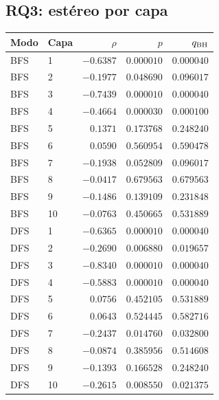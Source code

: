 \documentclass[11pt,a4paper]{article}
\begin{document}
\subsection{RQ3: estéreo por capa}
{\small\setlength{\tabcolsep}{5pt}
\begin{longtable}{llrrr}
\toprule
Modo & Capa & $\rho$ & $p$ & $q_{\rm BH}$ \\
\midrule\endhead
BFS & 1 & $-0.6387$ & $0.000010$ & $0.000040$ \\
BFS & 2 & $-0.1977$ & $0.048690$ & $0.096017$ \\
BFS & 3 & $-0.7439$ & $0.000010$ & $0.000040$ \\
BFS & 4 & $-0.4664$ & $0.000030$ & $0.000100$ \\
BFS & 5 & $0.1371$ & $0.173768$ & $0.248240$ \\
BFS & 6 & $0.0590$ & $0.560954$ & $0.590478$ \\
BFS & 7 & $-0.1938$ & $0.052809$ & $0.096017$ \\
BFS & 8 & $-0.0417$ & $0.679563$ & $0.679563$ \\
BFS & 9 & $-0.1486$ & $0.139109$ & $0.231848$ \\
BFS & 10 & $-0.0763$ & $0.450665$ & $0.531889$ \\
DFS & 1 & $-0.6365$ & $0.000010$ & $0.000040$ \\
DFS & 2 & $-0.2690$ & $0.006880$ & $0.019657$ \\
DFS & 3 & $-0.8340$ & $0.000010$ & $0.000040$ \\
DFS & 4 & $-0.5883$ & $0.000010$ & $0.000040$ \\
DFS & 5 & $0.0756$ & $0.452105$ & $0.531889$ \\
DFS & 6 & $0.0643$ & $0.524445$ & $0.582716$ \\
DFS & 7 & $-0.2437$ & $0.014760$ & $0.032800$ \\
DFS & 8 & $-0.0874$ & $0.385956$ & $0.514608$ \\
DFS & 9 & $-0.1393$ & $0.166528$ & $0.248240$ \\
DFS & 10 & $-0.2615$ & $0.008550$ & $0.021375$ \\
\bottomrule
\end{longtable}}
\end{document}
